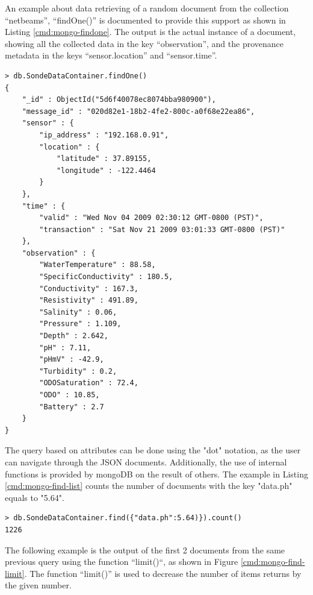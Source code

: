 An example about data retrieving of a random document from the collection
``netbeams'', ``findOne()'' is documented to provide this support as shown in
Listing \ref{cmd:mongo-findone}. The output is the actual instance of a
document, showing all the collected data in the key ``observation'', and the
provenance metadata in the keys ``sensor.location'' and ``sensor.time''.

\lstset{label=cmd:mongo-findone,caption=Querying the database: one item}
\begin{lstlisting}
> db.SondeDataContainer.findOne()
{
    "_id" : ObjectId("5d6f40078ec8074bba980900"),
    "message_id" : "020d82e1-18b2-4fe2-800c-a0f68e22ea86",
    "sensor" : {
        "ip_address" : "192.168.0.91",
        "location" : {
            "latitude" : 37.89155,
            "longitude" : -122.4464
        }
    },
    "time" : {
        "valid" : "Wed Nov 04 2009 02:30:12 GMT-0800 (PST)",
        "transaction" : "Sat Nov 21 2009 03:01:33 GMT-0800 (PST)"
    },
    "observation" : {
        "WaterTemperature" : 88.58,
        "SpecificConductivity" : 180.5,
        "Conductivity" : 167.3,
        "Resistivity" : 491.89,
        "Salinity" : 0.06,
        "Pressure" : 1.109,
        "Depth" : 2.642,
        "pH" : 7.11,
        "pHmV" : -42.9,
        "Turbidity" : 0.2,
        "ODOSaturation" : 72.4,
        "ODO" : 10.85,
        "Battery" : 2.7
    }
}
\end{lstlisting}

The query based on attributes can be done using the "dot" notation, as the user
can navigate through the JSON documents. Additionally, the use of internal
functions is provided by mongoDB on the result of others. The example in
Listing \ref{cmd:mongo-find-list} counts the number of documents with the key
"data.ph" equals to "5.64".

\lstset{label=cmd:mongo-find-list,caption=Execution of mongo client}
\begin{lstlisting}
> db.SondeDataContainer.find({"data.ph":5.64)}).count()
1226
\end{lstlisting}

The following example is the output of the first 2 documents from the same
previous query using the function ``limit()``, as shown in Figure
\ref{cmd:mongo-find-limit}. The function ``limit()'' is used to decrease the
number of items returns by the given number.

